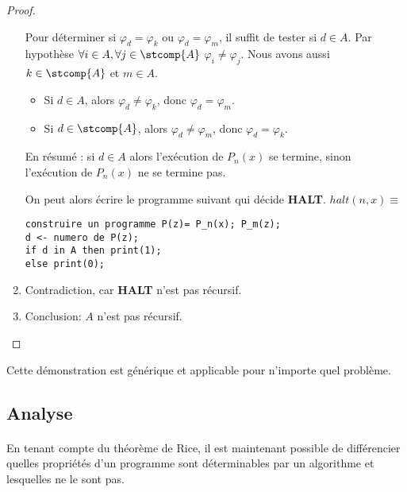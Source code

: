 \begin{proof}
\begin{enumerate}
Pour déterminer si $\varphi_d =\varphi_k$ ou  $\varphi_d =\varphi_m$, il suffit de tester si $d \in A$.   Par hypothèse  $\forall i \in A, \forall j \in \stcomp{A}$ $\varphi_i \neq \varphi_j$.  Nous avons aussi $k\in \stcomp{A}$ et $m\in A$.
			\begin{itemize}
            \item Si $d \in A$, alors  $\varphi_d \neq \varphi_k$, donc $\varphi_d =\varphi_m$.
            \item Si $d \in \stcomp{A}$, alors  $\varphi_d \neq \varphi_m$, donc $\varphi_d =\varphi_k$.
			\end{itemize}
En résumé : si $d \in A$ alors l'exécution de $P_n(x)$ se termine, sinon l'exécution de $P_n(x)$ ne se termine pas.

		On peut alors écrire le programme suivant qui décide \textbf{HALT}.
		 $halt(n,x) \equiv $
		\begin{lstlisting}
construire un programme P(z)= P_n(x); P_m(z);
d <- numero de P(z);
if d in A then print(1);
else print(0);
		\end{lstlisting}


	\item Contradiction, car \textbf{HALT} n'est pas récursif.
	\item Conclusion: $A$ n'est pas récursif.
\end{enumerate}

\end{proof}
Cette démonstration est générique et applicable pour n'importe quel problème.
\subsection{Analyse}

\paragraph{} En tenant compte du théorème de Rice, il est maintenant possible de différencier quelles propriétés d'un programme sont déterminables par un algorithme et lesquelles ne le sont pas.

